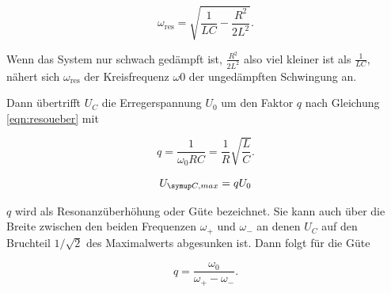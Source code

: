 \begin{equation}
  \omega_{\text{res}} = \sqrt{\frac{1}{LC} - \frac{R^2}{2L^2}}.
\end{equation}

Wenn das System nur schwach gedämpft ist, $\frac{R^2}{2L^2}$ also viel
kleiner ist als $\frac{1}{LC}$, nähert sich $\omega_{\text{res}}$ der
Kreisfrequenz $\omega{\text{0}}$ der ungedämpften Schwingung an.

Dann übertrifft $U_C$ die Erregerspannung $U_0$ um den Faktor $q$ nach
Gleichung \eqref{eqn:resoueber} mit

\begin{equation}
  q = \frac{1}{\omega_0RC} = \frac{1}{R}\sqrt{\frac{L}{C}}.
\end{equation}

\begin{equation}
  U_{\g{C,max}} = q U_{\text{0}}
  \label{eqn:resoueber}
\end{equation}

$q$ wird als Resonanzüberhöhung oder Güte bezeichnet.
Sie kann auch über die Breite zwischen den beiden Frequenzen $\omega_+$
und $\omega_-$ an denen $U_C$ auf den Bruchteil $1/\sqrt{2}$ des
Maximalwerts abgesunken ist. Dann folgt für die Güte

\begin{equation}
  q = \frac{\omega_{\text{0}}}{\omega_+ - \omega_-}.
\end{equation}
